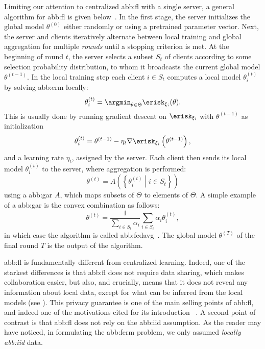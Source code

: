 Limiting our attention to centralized \gls{abb:fl} with a single server,
a general algorithm for \gls{abb:fl} is given below~\cite{%
  mcmahanCommunicationEfficientLearningDeep2017,%
  xiaSurveyFederatedLearning2021,%
  wangEdgeAIConvergence2020%
}.
In the first stage, the server initializes the global model \(\theta^{(0)}\)
either randomly or using a pretrained parameter vector.
Next, the server and clients iteratively alternate between local training and global aggregation
for multiple \emph{rounds} until a stopping criterion is met.
At the beginning of round \(t\), the server selects a subset \(S_{t}\) of clients
according to some selection probability distribution,
to whom it broadcasts the current global model \(\theta^{(t-1)}\).
In the local training step each client \(i\in S_{t}\)
computes a local model \(\theta^{(t)}_{i}\) by solving \gls{abb:erm} locally:
\begin{equation}
  \theta^{(t)}_{i} = \argmin_{\theta \in \Theta} \erisk_{\xi_{i}}(\theta).
\end{equation}
This is usually done by running gradient descent on \(\erisk_{\xi_{i}}\)
with \(\theta^{(t-1)}\) as initialization
\begin{equation}
  \theta^{(t)}_{i} = \theta^{(t-1)} - \eta_{t}\nabla \erisk_{\xi_{i}}\left(\theta^{(t-1)}\right),
\end{equation}
and a learning rate \(\eta_{t}\), assigned by the server.
Each client then sends its local model \(\theta^{(t)}_{i}\) to the server,
where aggregation is performed:
\begin{equation}
  \theta^{(t)} = A\left( \left\{ \theta^{(t)}_{i} \middle| i \in S_{t} \right\} \right)
\end{equation}
using a \gls{abb:gar} \(A\), which maps subsets of \(\Theta\) to elements of \(\Theta\).
A simple example of a \gls{abb:gar} is the convex combination as follows:
\begin{equation}\label{eq:fedavg}
  \theta^{(t)} = \frac{1}{\sum_{i\in S_{t}}\alpha_{i}}
  \sum_{i\in S_{t}} \alpha_{i} \theta^{(t)}_{i},
\end{equation}
in which case the algorithm is called \gls{abb:fedavg}~\cite{mcmahanCommunicationEfficientLearningDeep2017}.
The global model \(\theta^{(T)}\) of the final round \(T\)
is the output of the algorithm.


\gls{abb:fl} is fundamentally different from centralized learning.
Indeed, one of the starkest differences is that \gls{abb:fl} does not require data sharing,
which makes collaboration easier, but also, and crucially,
means that it does not reveal any information about local data,
except for what can be inferred from the local models (see ).
This privacy guarantee is one of the main selling points of \gls{abb:fl},
and indeed one of the motivations cited for its introduction%
~\cite{mcmahanCommunicationEfficientLearningDeep2017}.
A second point of contrast is that \gls{abb:fl} does not rely on the \gls{abb:iid} assumption.
As the reader may have noticed, in formulating the \gls{abb:ferm} problem,
we only assumed \emph{locally \gls{abb:iid}} data.

